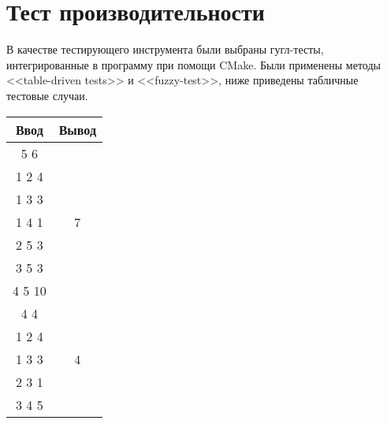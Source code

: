 \section{Тест производительности}

В качестве тестирующего инструмента были выбраны гугл-тесты, интегрированные в программу при помощи CMake. Были применены методы <<table-driven tests>> и <<fuzzy-test>>, ниже приведены табличные тестовые случаи.

\begin{center}
	
	\begin{tabular}{| c | c |}
		\hline
		Ввод & Вывод \\
		\hline
		5 6 & \\
		1 2 4 & \\
		1 3 3 & \\
		1 4 1 & 7 \\
		2 5 3  & \\
		3 5 3 & \\
		4 5 10 & \\
		\hline
		4 4 & \\
		1 2 4 & \\
		1 3 3 & 4\\
		2 3 1 & \\
		3 4 5 & \\
		\hline
	\end{tabular}

\end{center}

\pagebreak

